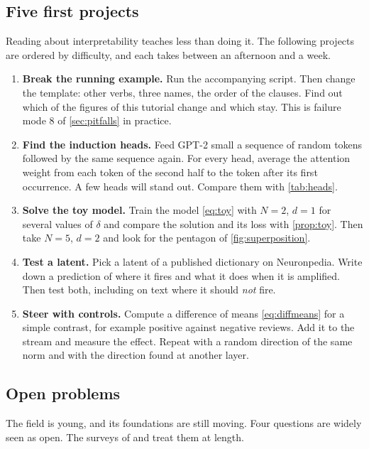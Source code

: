 \subsection{Five first projects}

Reading about interpretability teaches less than doing it. The following projects are ordered by difficulty,
and each takes between an afternoon and a week.

\begin{enumerate}
\item \textbf{Break the running example.} Run the accompanying script. Then change the template: other verbs,
three names, the order of the clauses. Find out which of the figures of this tutorial change and which stay.
This is failure mode 8 of \cref{sec:pitfalls} in practice.
\item \textbf{Find the induction heads.} Feed GPT-2 small a sequence of random tokens followed by the same
sequence again. For every head, average the attention weight from each token of the second half to the token
after its first occurrence. A few heads will stand out. Compare them with \cref{tab:heads}.
\item \textbf{Solve the toy model.} Train the model \eqref{eq:toy} with $N=2$, $d=1$ for several values of
$\delta$ and compare the solution and its loss with \cref{prop:toy}. Then take $N=5$, $d=2$ and look for the
pentagon of \cref{fig:superposition}.
\item \textbf{Test a latent.} Pick a latent of a published dictionary on Neuronpedia. Write down a prediction
of where it fires and what it does when it is amplified. Then test both, including on text where it should
\emph{not} fire.
\item \textbf{Steer with controls.} Compute a difference of means \eqref{eq:diffmeans} for a simple contrast,
for example positive against negative reviews. Add it to the stream and measure the effect. Repeat with a random
direction of the same norm and with the direction found at another layer.
\end{enumerate}

\subsection{Open problems}

The field is young, and its foundations are still moving. Four questions are widely seen as open. The surveys
of \citet{sharkey2025open} and \citet{barez2026understanding} treat them at length.

